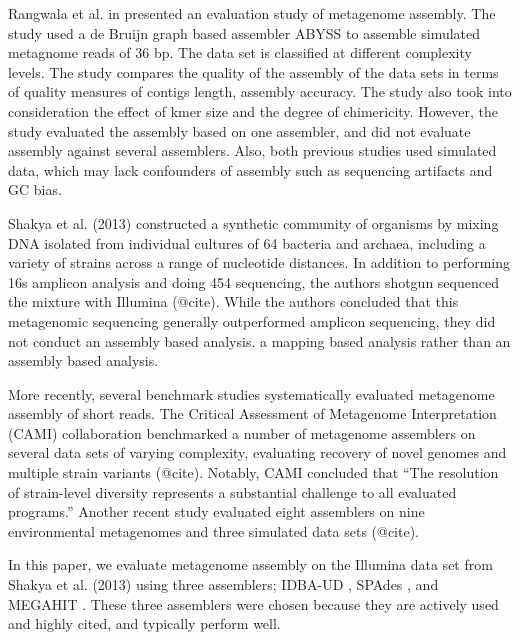 \documentclass[10pt,a4paper,twocolumn]{article}
\begin{document}
Rangwala et al. in \cite{huzefa2011} presented an evaluation study of
metagenome assembly. The study used a de Bruijn graph based assembler
ABYSS \cite{abyss} to assemble simulated metagnome reads of 36 bp. The
data set is classified at different complexity levels.
The study compares the quality of the assembly of the data sets in
terms of quality measures of contigs length, assembly accuracy. The
study also took into consideration the effect of kmer size and the
degree of chimericity.  However, the study evaluated the assembly
based on one assembler, and did not evaluate assembly against several
assemblers.  Also, both previous studies used simulated data, which
may lack confounders of assembly such as sequencing artifacts and GC bias.

Shakya et al. (2013) constructed a synthetic community of organisms by
mixing DNA isolated from individual cultures of 64 bacteria and
archaea, including a variety of strains across a range of nucleotide
distances.  In addition to performing 16s amplicon analysis and doing
454 sequencing, the authors shotgun sequenced the mixture with
Illumina (@cite).  While the authors concluded that this metagenomic
sequencing generally outperformed amplicon sequencing, they did not
conduct an assembly based analysis.
a mapping based analysis rather than an assembly based analysis.


More recently, several benchmark studies systematically evaluated
metagenome assembly of short reads.  The Critical Assessment of
Metagenome Interpretation (CAMI) collaboration benchmarked a number of
metagenome assemblers on several data sets of varying complexity,
evaluating recovery of novel genomes and multiple strain variants
(@cite).  Notably, CAMI concluded that ``The resolution of
strain-level diversity represents a substantial challenge to all
evaluated programs.''  Another recent study evaluated eight assemblers
on nine environmental metagenomes and three simulated data sets (@cite).

In this paper, we evaluate metagenome assembly on the Illumina data set from
Shakya et al. (2013) using three assemblers; IDBA-UD \cite{idba},
SPAdes \cite {spades}, and MEGAHIT \cite{megahit}.  These three assemblers
were chosen because they are actively used and highly cited, and typically
perform well.
\end{document}
